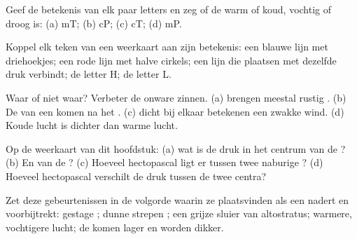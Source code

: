 \begin{exercise}[$\star$]\label{exo:g8:fronts-and-weather-maps:1}
Geef de betekenis van elk paar letters en zeg of de  warm of
koud, vochtig of droog is: (a) mT; (b) cP; (c) cT; (d) mP.
\end{exercise}

\begin{exercise}[$\star$]\label{exo:g8:fronts-and-weather-maps:2}
Koppel elk teken van een weerkaart aan zijn betekenis: een blauwe lijn met
driehoekjes; een rode lijn met halve cirkels; een lijn die plaatsen met
dezelfde druk verbindt; de letter H; de letter L.
\end{exercise}

\begin{exercise}[$\star$]\label{exo:g8:fronts-and-weather-maps:3}
Waar of niet waar? Verbeter de onware zinnen. (a)  brengen
meestal rustig . (b) De  van een  komen na het .
(c)  dicht bij elkaar betekenen een zwakke wind. (d) Koude lucht
is dichter dan warme lucht.
\end{exercise}

\begin{exercise}[$\star$]\label{exo:g8:fronts-and-weather-maps:4}
Op de weerkaart van dit hoofdstuk: (a) wat is de druk in het centrum van de
? (b) En van de ? (c) Hoeveel hectopascal ligt er
tussen twee naburige ? (d) Hoeveel hectopascal verschilt de druk
tussen de twee centra?
\end{exercise}

\begin{exercise}[$\star\star$]\label{exo:g8:fronts-and-weather-maps:5}
Zet deze gebeurtenissen in de volgorde waarin ze plaatsvinden als een
 nadert en voorbijtrekt: gestage ; dunne strepen ;
een grijze sluier van altostratus; warmere, vochtigere lucht; de 
komen lager en worden dikker.
\end{exercise}

